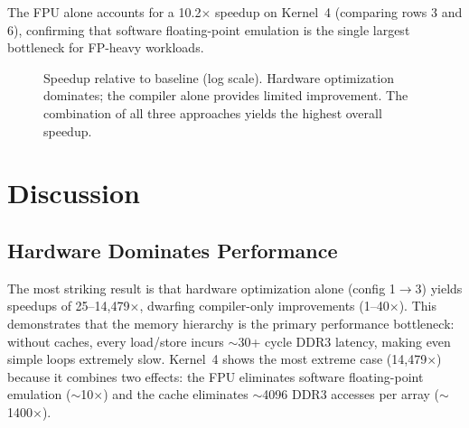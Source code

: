 \documentclass[11pt,a4paper]{article}
\begin{document}
\vspace{-0.2cm}
\noindent The FPU alone accounts for a 10.2$\times$ speedup on Kernel~4 (comparing rows 3 and 6), confirming that software floating-point emulation is the single largest bottleneck for FP-heavy workloads.

\begin{figure}[H]
\centering
{}
\caption{Speedup relative to baseline (log scale). Hardware optimization dominates; the compiler alone provides limited improvement. The combination of all three approaches yields the highest overall speedup.}
\label{fig:speedup}
\end{figure}

\section{Discussion}

\subsection{Hardware Dominates Performance}

The most striking result is that hardware optimization alone (config 1$\to$3) yields speedups of 25--14{,}479$\times$, dwarfing compiler-only improvements (1--40$\times$). This demonstrates that the memory hierarchy is the primary performance bottleneck: without caches, every load/store incurs $\sim$30+ cycle DDR3 latency, making even simple loops extremely slow. Kernel~4 shows the most extreme case (14{,}479$\times$) because it combines two effects: the FPU eliminates software floating-point emulation ($\sim$10$\times$) and the cache eliminates $\sim$4096 DDR3 accesses per array ($\sim$1400$\times$).
\end{document}
